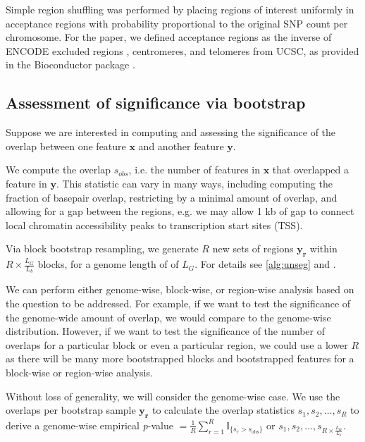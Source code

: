 \documentclass{article}
\begin{document}
Simple region shuffling was performed by placing regions of interest
uniformly in acceptance regions with probability proportional to the
original SNP count per chromosome. For the paper, we defined
acceptance regions as the inverse of
ENCODE excluded regions ,
centromeres, and telomeres from UCSC,
as provided in the  Bioconductor package
\citep{excluderanges}.

\subsection{Assessment of significance via bootstrap}

Suppose we are interested in computing and assessing the significance
of the overlap between one feature
$\bm{x}$ and another feature $\bm{y}$.

We compute the overlap $s_{obs}$, i.e. the number of 
features in $\bm{x}$ that overlapped a feature in $\bm{y}$.
This statistic can vary in many ways, including computing the fraction of
basepair overlap, restricting by a minimal amount of overlap, and
allowing for a gap between the regions, e.g. we may allow 1 kb of gap
to connect local chromatin accessibility peaks to transcription start
sites (TSS).

Via block bootstrap resampling, we generate $R$ new
sets of regions $\bm{y_r}$ within $R \times \frac{L_G}{L_b}$ blocks, for
a genome length of of $L_G$.
For details see \cref{alg:unseg} and .

We can perform either genome-wise, block-wise, or region-wise analysis
based on the question to be addressed. For example, if we want to test
the significance of the genome-wide amount of overlap, we would compare
to the genome-wise distribution. However, if we want to
test the significance of the number of overlaps for a particular
block or even a particular region, we could use a lower $R$ as there
will be many more bootstrapped blocks and bootstrapped features for a
block-wise or region-wise analysis.

Without loss of generality, we will consider the genome-wise case.
We use the overlaps per bootstrap sample $\bm{y_r}$ to calculate the
overlap statistics $s_{1}, s_{2}, \dots, s_{R}$
to derive a genome-wise empirical \textit{p}-value
$= \frac{1}{R} \sum_{r=1}^R \mathbb{I}_{\{s_r > s_\text{obs}\}}$ or
$s_{1}, s_{2},..., s_{R\times \frac{L_G}{L_b}}$.
\end{document}
